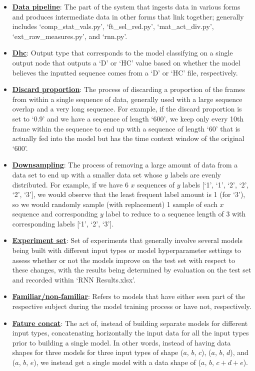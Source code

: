 \documentclass[12pt,twoside]{report}
\begin{document}
\begin{itemize}
	\item \underline{\textbf{Data pipeline}}: The part of the system that ingests data in various forms and produces intermediate data in other forms that link together; generally includes ‘comp\_stat\_vals.py’, ‘ft\_sel\_red.py’, ‘mat\_act\_div.py’, ‘ext\_raw\_measures.py’, and ‘rnn.py’.
	\item \underline{\textbf{Dhc}}: Output type that corresponds to the model classifying on a single output node that outputs a ‘D’ or ‘HC’ value based on whether the model believes the inputted sequence comes from a ‘D’ or ‘HC’ file, respectively.
	\item \underline{\textbf{Discard proportion}}: The process of discarding a proportion of the frames from within a single sequence of data, generally used with a large sequence overlap and a very long sequence. For example, if the discard proportion is set to ‘0.9’ and we have a sequence of length ‘600’, we keep only every 10th frame within the sequence to end up with a sequence of length ‘60’ that is actually fed into the model but has the time context window of the original ‘600’.
	\item \underline{\textbf{Downsampling}}: The process of removing a large amount of data from a data set to end up with a smaller data set whose $y$ labels are evenly distributed. For example, if we have 6 $x$ sequences of $y$ labels [‘1’, ‘1’, ‘2’, ‘2’, ‘2’, ‘3’], we would observe that the least frequent label amount is 1 (for ‘3’), so we would randomly sample (with replacement) 1 sample of each $x$ sequence and corresponding $y$ label to reduce to a sequence length of 3 with corresponding labels [‘1’, ‘2’, ‘3’].
	\item \underline{\textbf{Experiment set}}: Set of experiments that generally involve several models being built with different input types or model hyperparameter settings to assess whether or not the models improve on the test set with respect to these changes, with the results being determined by evaluation on the test set and recorded within ‘RNN Results.xlsx’.
	\item \underline{\textbf{Familiar/non-familiar}}: Refers to models that have either seen part of the respective subject during the model training process or have not, respectively.
	\item \underline{\textbf{Fature concat}}: The act of, instead of building separate models for different input types, concatenating horizontally the input data for all the input types prior to building a single model. In other words, instead of having data shapes for three models for three input types of shape ($a$, $b$, $c$), ($a$, $b$, $d$), and ($a$, $b$, $e$), we instead get a single model with a data shape of ($a$, $b$, $c+d+e$).

\end{itemize}
\end{document}
